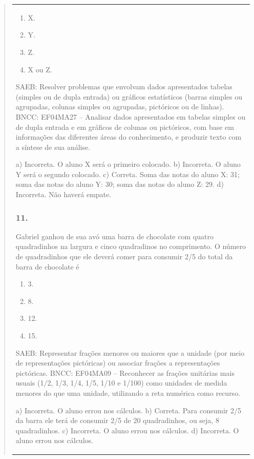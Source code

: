 \begin{mdframed}[linewidth=2pt,linecolor=salmao,roundcorner=2pt]
\begin{itemize}
{\begin{itemize}
\begin{escolha}
{\begin{quote}
{\begin{escolha}
{{{{{\begin{longtable}[]{@{}l@{}}
\begin{itemize}
{\begin{enumerate}
\item
  X.
\item
  Y.
\item
  Z.
\item
  X ou Z.
\end{enumerate}

SAEB: Resolver problemas que envolvam dados apresentados
tabelas (simples ou de dupla entrada) ou gráficos estatísticos (barras
simples ou agrupadas, colunas simples ou agrupadas, pictóricos ou de
linhas).
BNCC: EF04MA27 -- Analisar dados apresentados em tabelas simples ou de dupla entrada e em gráficos de
colunas ou pictóricos, com base em informações das diferentes áreas do conhecimento, e produzir
texto com a síntese de sua análise.

a) Incorreta. O aluno X será o primeiro colocado.
b) Incorreta. O aluno Y será o segundo colocado.
c) Correta. Soma das notas do aluno X: 31; soma das notas do aluno Y: 30; soma das notas do aluno Z: 29.
d) Incorreta. Não haverá empate.

\subsubsection{11.}

Gabriel ganhou de sua avó uma barra de chocolate com quatro quadradinhos na largura e cinco quadradinos no comprimento.
O número de quadradinhos que ele deverá comer para consumir 2/5 do total
da barra de chocolate é

\begin{enumerate}
\item
  3.
\item
  8.
\item
  12.
\item
  15.
\end{enumerate}

SAEB: Representar frações menores ou maiores que a unidade
(por meio de representações pictóricas) ou associar frações a
representações pictóricas.
BNCC: EF04MA09 -- Reconhecer as frações unitárias mais usuais (1/2, 1/3, 1/4, 1/5, 1/10 e 1/100) como
unidades de medida menores do que uma unidade, utilizando a reta numérica como recurso.

a) Incorreta. O aluno errou nos cálculos.
b) Correta. Para consumir 2/5 da barra ele terá de consumir 2/5 de 20 quadradinhos, ou seja, 8 quadradinhos.
c) Incorreta. O aluno errou nos cálculos.
d) Incorreta. O aluno errou nos cálculos.

}
\end{itemize}
\end{longtable}}}}}}
\end{escolha}}
\end{quote}}
\end{escolha}
\end{itemize}}
\end{itemize}
\end{mdframed}
